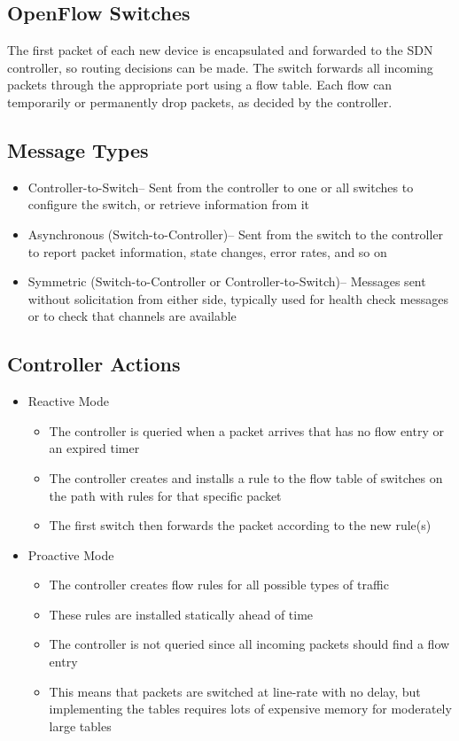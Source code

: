 \subsection*{OpenFlow Switches}

The first packet of each new device is encapsulated and forwarded to the SDN controller, so routing decisions can be
 made. The switch forwards all incoming packets through the appropriate port using a flow table. Each flow can
 temporarily or permanently drop packets, as decided by the controller.

\subsection*{Message Types}

\begin{itemize}
  \item Controller-to-Switch-- Sent from the controller to one or all switches to configure the switch, or retrieve
   information from it
  \item Asynchronous (Switch-to-Controller)-- Sent from the switch to the controller to report packet information,
   state changes, error rates, and so on
  \item Symmetric (Switch-to-Controller or Controller-to-Switch)-- Messages sent without solicitation from either side,
   typically used for health check messages or to check that channels are available
\end{itemize}

\subsection*{Controller Actions}

\begin{itemize}
  \item Reactive Mode
  \begin{itemize}
    \item The controller is queried when a packet arrives that has no flow entry or an expired timer
    \item The controller creates and installs a rule to the flow table of switches on the path with rules for that
     specific packet
    \item The first switch then forwards the packet according to the new rule(s)
  \end{itemize}
  \item Proactive Mode
  \begin{itemize}
    \item The controller creates flow rules for all possible types of traffic
    \item These rules are installed statically ahead of time
    \item The controller is not queried since all incoming packets should find a flow entry
    \item This means that packets are switched at line-rate with no delay, but implementing the tables requires lots
     of expensive memory for moderately large tables
  \end{itemize}
\end{itemize}
